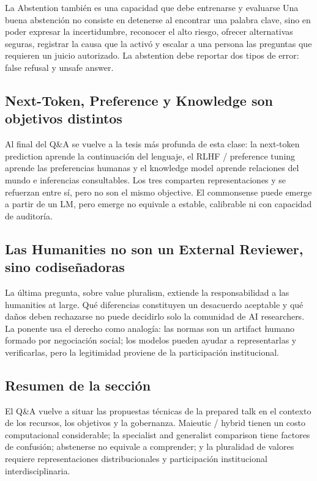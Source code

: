 \begin{importantbox}{La Abstention también es una capacidad que debe entrenarse y evaluarse}
Una buena abstención no consiste en detenerse al encontrar una palabra clave, sino en poder expresar la incertidumbre, reconocer el alto riesgo, ofrecer alternativas seguras, registrar la causa que la activó y escalar a una persona las preguntas que requieren un juicio autorizado. La abstention debe reportar dos tipos de error: false refusal y unsafe answer.
\end{importantbox}

\subsection{Next-Token, Preference y Knowledge son objetivos distintos}

Al final del Q\&A se vuelve a la tesis más profunda de esta clase: la next-token prediction aprende la continuación del lenguaje, el RLHF / preference tuning aprende las preferencias humanas y el knowledge model aprende relaciones del mundo e inferencias consultables. Los tres comparten representaciones y se refuerzan entre sí, pero no son el mismo objective. El commonsense puede emerge a partir de un LM, pero emerge no equivale a estable, calibrable ni con capacidad de auditoría.


\subsection{Las Humanities no son un External Reviewer, sino codiseñadoras}

La última pregunta, sobre value pluralism, extiende la responsabilidad a las humanities at large. Qué diferencias constituyen un desacuerdo aceptable y qué daños deben rechazarse no puede decidirlo solo la comunidad de AI researchers. La ponente usa el derecho como analogía: las normas son un artifact humano formado por negociación social; los modelos pueden ayudar a representarlas y verificarlas, pero la legitimidad proviene de la participación institucional.

\subsection{Resumen de la sección}

El Q\&A vuelve a situar las propuestas técnicas de la prepared talk en el contexto de los recursos, los objetivos y la gobernanza. Maieutic / hybrid tienen un costo computacional considerable; la specialist and generalist comparison tiene factores de confusión; abstenerse no equivale a comprender; y la pluralidad de valores requiere representaciones distribucionales y participación institucional interdisciplinaria.
